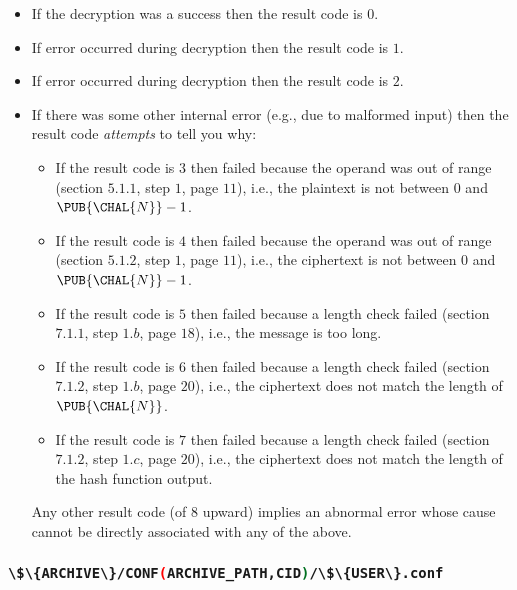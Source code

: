 \documentclass[crop={false},multi={true},tikz={true}]{standalone}
\begin{document}
\begin{itemize}
\item If the decryption was a success                   
      then the result code is $0$.
\item If error  occurred during decryption 
      then the result code is $1$.
\item If error  occurred during decryption 
      then the result code is $2$.
\item If there was some other internal error (e.g., due to malformed input)
      then the result code {\em attempts} to tell you why: 

      \begin{itemize}
      \item If the result code is $3$ then               
            failed because the operand was out of range 
            (section $5.1.1$, step $1$, page $11$), 
            i.e., the  plaintext is not between $0$ and $\PUB{\CHAL{N}}-1$.
      \item If the result code is $4$ then               
            failed because the operand was out of range 
            (section $5.1.2$, step $1$, page $11$), 
            i.e., the ciphertext is not between $0$ and $\PUB{\CHAL{N}}-1$.
      \item If the result code is $5$ then  
            failed because a length check failed        
            (section $7.1.1$, step $1.b$, page $18$), 
            i.e., the message is too long.
      \item If the result code is $6$ then  
            failed because a length check failed        
            (section $7.1.2$, step $1.b$, page $20$), 
            i.e., the ciphertext does not match the length of $\PUB{\CHAL{N}}$.
      \item If the result code is $7$ then  
            failed because a length check failed        
            (section $7.1.2$, step $1.c$, page $20$), 
            i.e., the ciphertext does not match the length of the hash function output.
      \end{itemize}

      \noindent
      Any other result code (of $8$ upward) implies an abnormal error whose
      cause cannot be directly associated with any of the above.
\end{itemize}

\subsubsection{\lstinline[language={bash}]|\$\{ARCHIVE\}/CONF(ARCHIVE_PATH,CID)/\$\{USER\}.conf|}
\end{document}
